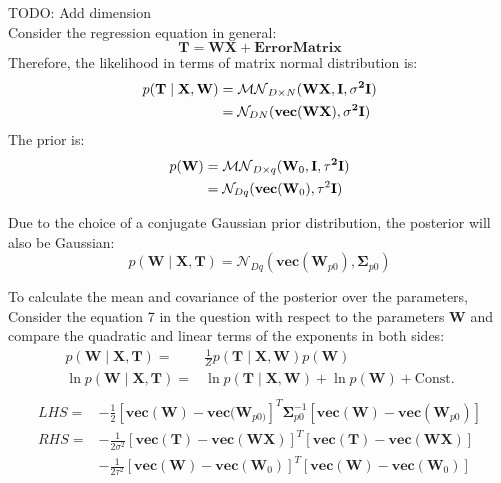 \documentclass[12pt]{article}
\newenvironment{question}[2][Question]{\begin{trivlist}
\kern10pt
\item[\hskip \labelsep {\bfseries #1}\hskip \labelsep {\bfseries #2.}]}{\end{trivlist}}
\begin{document}
\begin{question}{5}
TODO: Add dimension\\
Consider the regression equation in general:
$$\textbf{T} = \textbf{WX} + \textbf{ErrorMatrix} $$
Therefore, the likelihood in terms of matrix normal distribution is:
\begin{align*}
p(\bf{T}\mid \bf{X}, \bf{W}) &= 
  \mathcal{MN}_{D \times N}(\bf{WX}, \bf{I}, \sigma^2 \bf{I}) \\ 
  &= \mathcal{N}_{DN}(\bf{vec}(\bf{WX}), \sigma^2 \bf{I})
\end{align*}
The prior is:
\begin{align*}
p(\bf{W}) &= 
  \mathcal{MN}_{D \times q}(\textbf{W}_0, \bf{I}, \tau^2 \bf{I}) \\
  &= \mathcal{N}_{Dq}(\textbf{vec}(\textbf{W}_0), \tau^2 \bf{I})
\end{align*}

Due to the choice of a conjugate Gaussian prior distribution, the posterior will 
also be Gaussian:
$$
p(\textbf{W}\mid \textbf{X}, \textbf{T}) =
  \mathcal{N}_{Dq}(\textbf{vec}(\textbf{W}_{p0}), \bm{\Sigma}_{p0} )
$$

To calculate the mean and covariance of the posterior over the parameters,
Consider the equation 7 in the question with respect to the parameters $\textbf{W}$
 and compare the quadratic and linear terms of the exponents in both sides:
\begin{align*}
  p(\textbf{W}\mid \textbf{X}, \textbf{T}) =&
  \frac{1}{Z}p(\textbf{T}\mid \textbf{X}, \textbf{W})p(\textbf{W})  \\
  \ln p(\textbf{W}\mid \textbf{X}, \textbf{T}) =&
  \ln p(\textbf{T}\mid \textbf{X}, \textbf{W}) + \ln p(\textbf{W}) + \text{Const.} \\
\end{align*}
\begin{align*}
  LHS =& -\frac12[\textbf{vec}(\textbf{W}) - \textbf{vec}(\textbf{W}_{p0)}]^T
          \bm{\Sigma}_{p0}^{-1}[\textbf{vec}(\textbf{W})-\textbf{vec}(\textbf{W}_{p0})] \\
  RHS =& -\frac{1}{2\sigma^2}[\textbf{vec}(\textbf{T}) - \textbf{vec}(\textbf{WX})]^T
                             [\textbf{vec}(\textbf{T}) - \textbf{vec}(\textbf{WX})] \\
       &-\frac{1}{2\tau^2}[\textbf{vec}(\textbf{W}) - \textbf{vec}(\textbf{W}_0)]^T
                          [\textbf{vec}(\textbf{W}) - \textbf{vec}(\textbf{W}_0)]
\end{align*}


\end{question}
\end{document}
